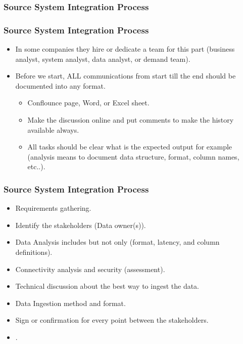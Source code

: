 \subsubsection{Source System Integration Process}
\begin{frame}
\frametitle{Source System Integration Process}
\begin{itemize}[<+->]
\item In some companies they hire or dedicate a team for this part (business analyst, system analyst, data analyst, or demand team).
\item Before we start, ALL communications from start till the end should be documented into any format.
	\begin{itemize}
		\item  Conflounce page, Word, or Excel sheet.
		\item  Make the discussion online and put comments to make the history available always.
		\item  All tasks should be clear what is the expected output for example (analysis means to document data structure, format, column names, etc..).
	\end{itemize}
\end{itemize}

\end{frame}

\begin{frame}
\frametitle{Source System Integration Process}
\begin{itemize}[<+->]
	\item  Requirements gathering. %
	\item  Identify the stakeholders (Data owner(s)).
	\item  Data Analysis includes but not only (format, latency, and column definitions).
	\item  Connectivity analysis and security (assessment).
	\item  Technical discussion about the best way to ingest the data.
	\item  Data Ingestion method and format.
	\item  Sign or confirmation for every point between the stakeholders.
	\item  {}.
\end{itemize}

\end{frame}


